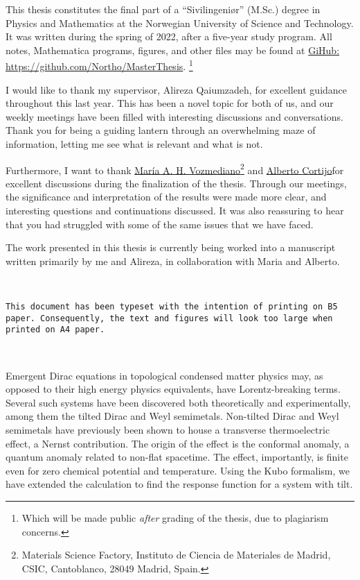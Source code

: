 This thesis constitutes the final part of a ``Sivilingeniør'' (M.Sc.) degree in Physics and Mathematics at the Norwegian University of Science and Technology.
It was written during the spring of 2022, after a five-year study program.
All notes, Mathematica programs, figures, and other files may be found at \href{https://github.com/Northo/MasterThesis}{\textsf{GiHub: https://github.com/Northo/MasterThesis}}.%
\footnote{Which will be made public \emph{after} grading of the thesis, due to plagiarism concerns.}

I would like to thank my supervisor, Alireza Qaiumzadeh, for excellent guidance throughout this last year.
This has been a novel topic for both of us, and our weekly meetings have been filled with interesting discussions and conversations.
Thank you for being a guiding lantern through an overwhelming maze of information, letting me see what is relevant and what is not.

Furthermore, I want to thank
\href{https://wp.icmm.csic.es/field-theories-in-condensed-matter-physics/vozmediano/}{María A. H. Vozmediano}\footnote{Materials Science Factory, Instituto de Ciencia de Materiales de Madrid, CSIC, Cantoblanco, 28049 Madrid, Spain\label{address-of-spain}.}
and
\href{https://wp.icmm.csic.es/field-theories-in-condensed-matter-physics/alberto-cortijo/}{Alberto Cortijo}\footnotemark[1]
for excellent discussions during the finalization of the thesis.
Through our meetings, the significance and interpretation of the results were made more clear, and interesting questions and continuations discussed.
It was also reassuring to hear that you had struggled with some of the same issues that we have faced.

The work presented in this thesis is currently being worked into a manuscript written primarily by me and Alireza, in collaboration with Maria and Alberto.


{
  \vfill
  \centering
  \color{black!80}
  \hrulefill\bigskip\\
  \parbox{0.84\textwidth}{
    \centering
    \texttt{This document has been typeset with the intention of printing on B5 paper. Consequently, the text and figures will look too large when printed on A4 paper.}
  }\\
  \bigskip\smallskip\hrulefill
  \vfill
}

Emergent Dirac equations in topological condensed matter physics may, as opposed to their high energy physics equivalents, have Lorentz-breaking terms.
Several such systems have been discovered both theoretically and experimentally, among them the tilted Dirac and Weyl semimetals.
Non-tilted Dirac and Weyl semimetals have previously been shown to house a transverse thermoelectric effect, a Nernst contribution.
The origin of the effect is the conformal anomaly, a quantum anomaly related to non-flat spacetime.
The effect, importantly, is finite even for zero chemical potential and temperature.
Using the Kubo formalism, we have extended the calculation to find the response function for a system with tilt.


